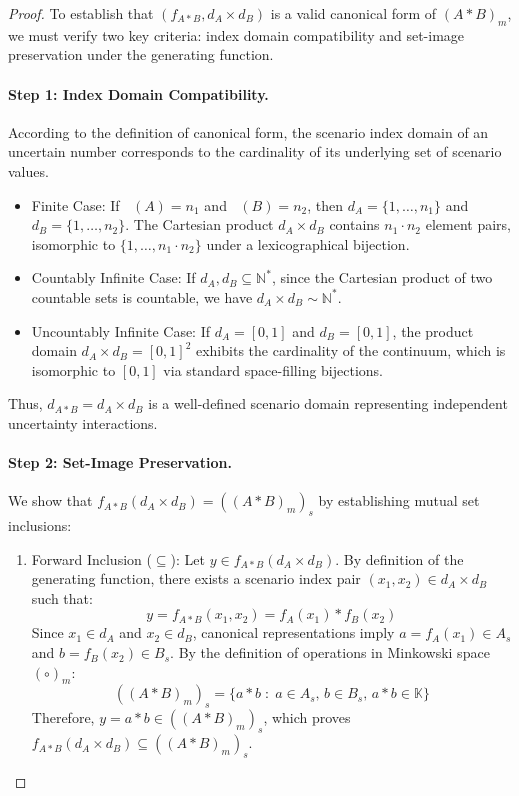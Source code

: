 \documentclass[a4paper,12pt,twoside]{memoir}
\DeclareMathOperator{\dimU}{\dim_U}
\newcommand{\kgdt}[1]{\left(#1\right)_m} %
\begin{document}
	\begin{proof}
		To establish that $(f_{A*B}, d_A \times d_B)$ is a valid canonical form of $\kgdt{A * B}$, we must verify two key criteria: index domain compatibility and set-image preservation under the generating function.
		
		\paragraph{Step 1: Index Domain Compatibility.}
		According to the definition of canonical form, the scenario index domain of an uncertain number corresponds to the cardinality of its underlying set of scenario values.
		\begin{itemize}[leftmargin=*]
			\item Finite Case: If $\dimU(A) = n_1$ and $\dimU(B) = n_2$, then $d_A = \{1, \dots, n_1\}$ and $d_B = \{1, \dots, n_2\}$. The Cartesian product $d_A \times d_B$ contains $n_1 \cdot n_2$ element pairs, isomorphic to $\{1, \dots, n_1 \cdot n_2\}$ under a lexicographical bijection.
			\item Countably Infinite Case: If $d_A, d_B \subseteq \mathbb{N}^*$, since the Cartesian product of two countable sets is countable, we have $d_A \times d_B \sim \mathbb{N}^*$.
			\item Uncountably Infinite Case: If $d_A = [0, 1]$ and $d_B = [0, 1]$, the product domain $d_A \times d_B = [0, 1]^2$ exhibits the cardinality of the continuum, which is isomorphic to $[0, 1]$ via standard space-filling bijections.
		\end{itemize}
		Thus, $d_{A*B} = d_A \times d_B$ is a well-defined scenario domain representing independent uncertainty interactions.
		
		\paragraph{Step 2: Set-Image Preservation.}
		We show that $f_{A*B}(d_A \times d_B) = (\kgdt{A * B})_s$ by establishing mutual set inclusions:
		
		\begin{enumerate}[leftmargin=*]
			\item Forward Inclusion ($\subseteq$):
			Let $y \in f_{A*B}(d_A \times d_B)$. By definition of the generating function, there exists a scenario index pair $(x_1, x_2) \in d_A \times d_B$ such that:
			\[
			y = f_{A*B}(x_1, x_2) = f_A(x_1) * f_B(x_2)
			\]
			Since $x_1 \in d_A$ and $x_2 \in d_B$, canonical representations imply $a = f_A(x_1) \in A_s$ and $b = f_B(x_2) \in B_s$. By the definition of operations in Minkowski space $(\circ)_m$:
			\[
			(\kgdt{A * B})_s = \{a * b \;:\; a \in A_s, \, b \in B_s, \, a * b \in \mathbb{K}\}
			\]
			Therefore, $y = a * b \in (\kgdt{A * B})_s$, which proves $f_{A*B}(d_A \times d_B) \subseteq (\kgdt{A * B})_s$.
			

\end{enumerate}
\end{proof}
\end{document}

